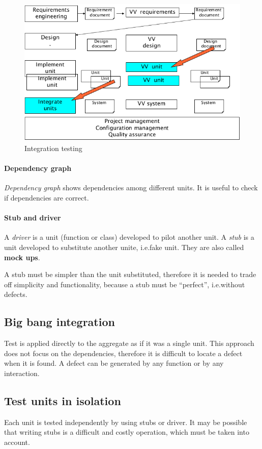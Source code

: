 \begin{figure}[hbtp]
\centering
\includegraphics[scale=0.35]{images/integration_testing.png}
\caption{Integration testing}
\end{figure}

\paragraph{Dependency graph}
\emph{Dependency graph} shows dependencies among different units. It is useful to check if dependencies are correct.

\paragraph{Stub and driver}
A \emph{driver} is a unit (function or class) developed to pilot another unit. A \emph{stub} is a unit developed to substitute another unite, i.e.\@ fake unit. They are also called \textbf{mock ups}.

A stub must be simpler than the unit substituted, therefore it is needed to trade off simplicity and functionality, because a stub must be ``perfect'', i.e.\@ without defects.

\subsection*{Big bang integration}
Test is applied directly to the aggregate as if it was a single unit. This approach does not focus on the dependencies, therefore it is difficult to locate a defect when it is found. A defect can be generated by any function or by any interaction.

\subsection*{Test units in isolation}
Each unit is tested independently by using stubs or driver. It may be possible that writing stubs is a difficult and costly operation, which must be taken into account.

